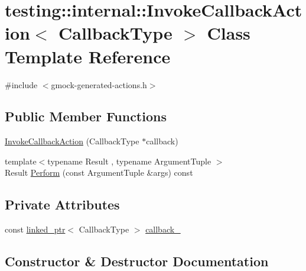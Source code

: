 \hypertarget{classtesting_1_1internal_1_1_invoke_callback_action}{}\section{testing\+::internal\+::Invoke\+Callback\+Action$<$ Callback\+Type $>$ Class Template Reference}
\label{classtesting_1_1internal_1_1_invoke_callback_action}


{\ttfamily \#include $<$gmock-\/generated-\/actions.\+h$>$}

\subsection*{Public Member Functions}
\begin{DoxyCompactItemize}
\item 
\mbox{\hyperlink{classtesting_1_1internal_1_1_invoke_callback_action_a21b051db0b2e1d33fd8d5cdfe7e6824b}{Invoke\+Callback\+Action}} (Callback\+Type $\ast$callback)
\item 
{\footnotesize template$<$typename Result , typename Argument\+Tuple $>$ }\\Result \mbox{\hyperlink{classtesting_1_1internal_1_1_invoke_callback_action_a74278acbfc51fe7407fdabc9d6a42c70}{Perform}} (const Argument\+Tuple \&args) const
\end{DoxyCompactItemize}
\subsection*{Private Attributes}
\begin{DoxyCompactItemize}
\item 
const \mbox{\hyperlink{classtesting_1_1internal_1_1linked__ptr}{linked\+\_\+ptr}}$<$ Callback\+Type $>$ \mbox{\hyperlink{classtesting_1_1internal_1_1_invoke_callback_action_ac9d602c5a1a39b130fd68906c2e3296d}{callback\+\_\+}}
\end{DoxyCompactItemize}


\subsection{Constructor \& Destructor Documentation}
\mbox{\label{classtesting_1_1internal_1_1_invoke_callback_action_a21b051db0b2e1d33fd8d5cdfe7e6824b}} 
